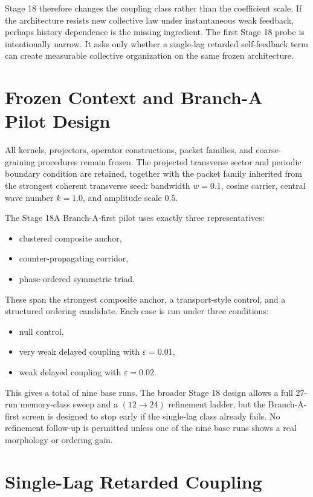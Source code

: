 \documentclass[11pt]{article}
\begin{document}
Stage 18 therefore changes the coupling class rather than the coefficient scale. If the architecture resists new collective law under instantaneous weak feedback, perhaps history dependence is the missing ingredient. The first Stage 18 probe is intentionally narrow. It asks only whether a single-lag retarded self-feedback term can create measurable collective organization on the same frozen architecture.

\section{Frozen Context and Branch-A Pilot Design}

All kernels, projectors, operator constructions, packet families, and coarse-graining procedures remain frozen. The projected transverse sector and periodic boundary condition are retained, together with the packet family inherited from the strongest coherent transverse seed: bandwidth $w=0.1$, cosine carrier, central wave number $k=1.0$, and amplitude scale $0.5$.

The Stage 18A Branch-A-first pilot uses exactly three representatives:
\begin{itemize}
\item clustered composite anchor,
\item counter-propagating corridor,
\item phase-ordered symmetric triad.
\end{itemize}

These span the strongest composite anchor, a transport-style control, and a structured ordering candidate. Each case is run under three conditions:
\begin{itemize}
\item null control,
\item very weak delayed coupling with $\varepsilon=0.01$,
\item weak delayed coupling with $\varepsilon=0.02$.
\end{itemize}

This gives a total of nine base runs. The broader Stage 18 design allows a full 27-run memory-class sweep and a $(12 \rightarrow 24)$ refinement ladder, but the Branch-A-first screen is designed to stop early if the single-lag class already fails. No refinement follow-up is permitted unless one of the nine base runs shows a real morphology or ordering gain.

\section{Single-Lag Retarded Coupling}
\end{document}

